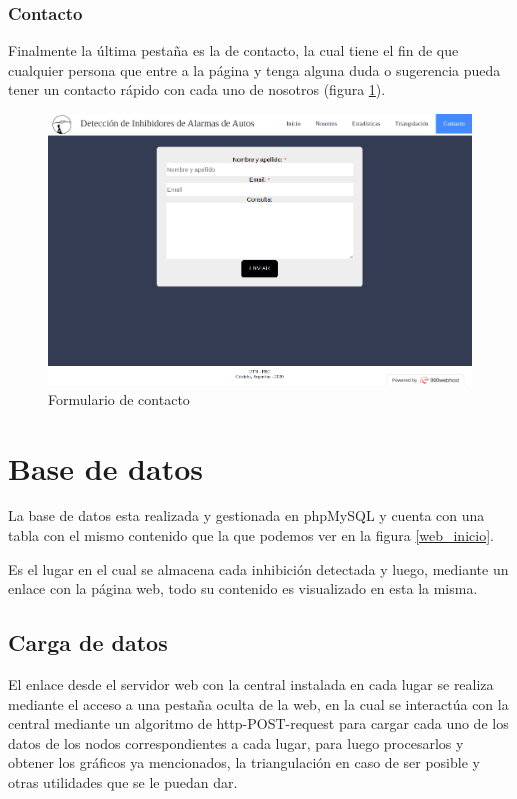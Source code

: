\subsubsection{Contacto}
Finalmente la última pestaña es la de contacto, la cual tiene el fin de que cualquier persona que entre a la página y tenga alguna duda o sugerencia
pueda tener un contacto rápido con cada uno de nosotros (figura \ref{web_contacto}).
\begin{figure}[h!]
	\centering
	\includegraphics[scale=0.33]{images/web/contacto-web.png}
    \caption{Formulario de contacto}
	\label{web_contacto}
\end{figure}
\section{Base de datos}
La base de datos esta realizada y gestionada en phpMySQL y cuenta con una tabla con el mismo contenido que la que podemos ver en la figura \ref{web_inicio}. \par 
Es el lugar en el cual se almacena cada inhibición detectada y luego, mediante un enlace con la página web, todo su 
contenido es visualizado en esta la misma. 
\subsection{Carga de datos}
\par El enlace desde el servidor web con la central instalada en cada lugar se realiza mediante el acceso a una pestaña oculta de la web, en la cual se interactúa
 con la central mediante un algoritmo de http-POST-request para cargar cada uno de los datos de los nodos correspondientes a cada lugar, para luego procesarlos y 
obtener los gráficos ya mencionados, la triangulación en caso de ser posible y otras utilidades que se le puedan dar. 
